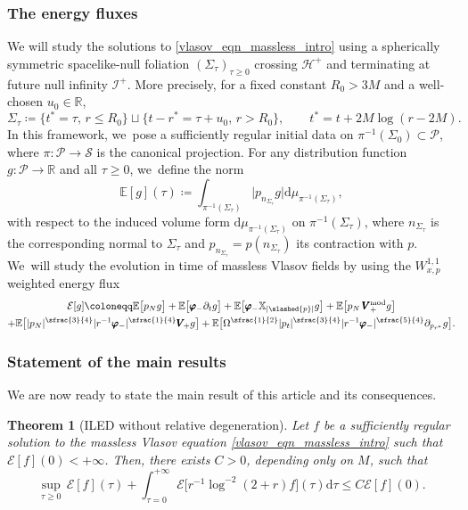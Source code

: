 \documentclass[JEP,XML,SOM,Unicode,published]{cedram}
\theoremstyle{plain}
\newtheorem{theorem}{Theorem}[section]
\theoremstyle{definition}
\newcommand\R{{\mathbb{R}}}
\newcommand\T{{\mathbb{X}}}
\renewcommand\H{{\mathcal{H}^+}}
\newcommand\dr{{\mathrm{d}}}
\begin{document}
\subsubsection{The energy fluxes}

We will study the solutions to \eqref{vlasov_eqn_massless_intro} using a spherically symmetric spacelike-null foliation $(\Sigma_\tau)_{\tau \geq 0}$ crossing $\H$ and terminating at future null infinity $\mathcal{I}^+$. More precisely, for a fixed constant $R_0 >3M$ and a well-chosen $u_0 \in \R$,
\[
\Sigma_\tau \coloneqq \bigl\{ t^* = \tau, \, r \leq R_0 \bigr\} \sqcup \bigl\{ t-r^*=\tau+u_0, \, r > R_0 \bigr\},\qquad t^*=t+2M\log (r-2M).
\]
In this framework, we~pose a sufficiently regular initial data on $\pi^{-1}(\Sigma_0) \subset \mathcal{P}$, where $\pi\colon \mathcal{P}\to \mathcal{S}$ is the canonical projection. For any distribution function $g : \mathcal{P} \to \R$ and all $\tau \geq 0$, we~define the norm
\[
\mathbb{E} [g](\tau) \coloneqq \int_{\pi^{-1}(\Sigma_\tau)} \big| p_{n_{\Sigma_\tau}} g \big| \dr \mu_{\pi^{-1}(\Sigma_\tau)},
\]
with respect to the induced volume form $\dr \mu_{\pi^{-1}(\Sigma_\tau)}$ on $\pi^{-1}(\Sigma_\tau)$, where $n_{\Sigma_\tau}$ is the corresponding normal to $\Sigma_\tau$ and $p_{n_{\Sigma_\tau}}=p(n_{\Sigma_\tau})$ its contraction with $p$. We~will study the evolution in time of massless Vlasov fields by using the $W^{1,1}_{x,p}$ weighted energy flux
\begin{multline*}
\mathcal{E}[g]\coloneqq \mathbb{E} \bigl[ p_N g \bigr]+\mathbb{E} \bigl[ \pmb{\varphi}_- \partial_t g \bigr] +\mathbb{E} \bigl[ \pmb{\varphi}_- \T_{|\slashed{p}|} g \bigr] + \mathbb{E} \bigl[ p_N \, \pmb{V}_+^{ \mathrm{mod}} g \bigr] \\
 +\mathbb{E} \bigl[ |p_N|^{\sfrac{3}{4}} |r^{-1} \pmb{\varphi}_-|^{\sfrac{1}{4}} \pmb{V}_{\! +} g \bigr] +\mathbb{E} \bigl[\Omega^{\sfrac{1}{2}}|p_t|^{\sfrac{3}{4}} |r^{-1} \pmb{\varphi}_-|^{\sfrac{5}{4}} \partial_{p_{r^*}} g \bigr].
\end{multline*}

\subsubsection{Statement of the main results}

We are now ready to state the main result of this article and its consequences.

\begin{theorem}[ILED without relative degeneration]\label{thm_main_intro}
Let $f $ be a sufficiently regular solution to the massless Vlasov equation \eqref{vlasov_eqn_massless_intro} such that $\mathcal{E}[f](0) <+\infty$. Then, there exists $C>0$, depending only on $M$, such that
\[
\sup_{\tau \geq 0} \, \mathcal{E}[f](\tau) +\int_{\tau=0}^{+\infty} \mathcal{E}\bigl[r^{-1} \log^{-2}(2+r)f \bigr](\tau) \dr \tau \leq C \mathcal{E}[f](0).
\]
\end{theorem}
\end{document}

